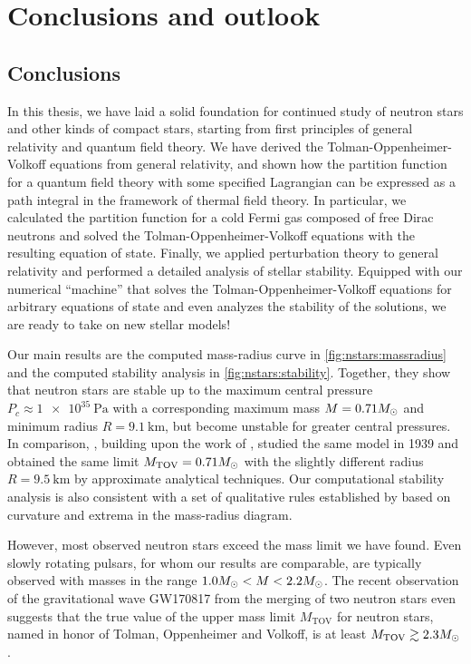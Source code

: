 \chapter{Conclusions and outlook}
\label{chap:conclusion}

\section{Conclusions}

In this thesis, we have laid a solid foundation for continued study of neutron stars and other kinds of compact stars, starting from first principles of general relativity and quantum field theory.
We have derived the Tolman-Oppenheimer-Volkoff equations from general relativity, and shown how the partition function for a quantum field theory with some specified Lagrangian can be expressed as a path integral in the framework of thermal field theory.
In particular, we calculated the partition function for a cold Fermi gas composed of free Dirac neutrons and solved the Tolman-Oppenheimer-Volkoff equations with the resulting equation of state.
Finally, we applied perturbation theory to general relativity and performed a detailed analysis of stellar stability.
Equipped with our numerical ``machine'' that solves the Tolman-Oppenheimer-Volkoff equations for arbitrary equations of state and even analyzes the stability of the solutions, we are ready to take on new stellar models!

Our main results are the computed mass-radius curve in \cref{fig:nstars:massradius} and the computed stability analysis in \cref{fig:nstars:stability}.
Together, they show that neutron stars are stable up to the maximum central pressure $P_c \approx \SI{1e35}{\pascal} $ with a corresponding maximum mass $M = 0.71 M_\odot$ and minimum radius $R = \SI{9.1}{\kilo\meter}$, but become unstable for greater central pressures.
In comparison, \cite{ref:tov}, building upon the work of \cite{ref:tolman}, studied the same model in 1939 and obtained the same limit $M_\text{TOV} = 0.71 M_\odot$ with the slightly different radius $R = \SI{9.5}{\kilo\meter}$ by approximate analytical techniques.
Our computational stability analysis is also consistent with a set of qualitative rules established by \cite{ref:stability_methods} based on curvature and extrema in the mass-radius diagram.

However, most observed neutron stars exceed the mass limit we have found.
Even slowly rotating pulsars, for whom our results are comparable, \cite[section 2.1]{ref:neutron_star_physics} are typically observed with masses in the range $1.0 M_\odot < M < 2.2 M_\odot$. \cite[figure 2 and 3]{ref:neutron_star_masses_paper}
The recent observation of the gravitational wave GW170817 from the merging of two neutron stars even suggests that the true value of the upper mass limit $M_\text{TOV}$ for neutron stars, named in honor of Tolman, Oppenheimer and Volkoff, is at least $M_\text{TOV} \gtrsim 2.3 M_\odot$. \cite{ref:gravitational_wave_tov_limit}

